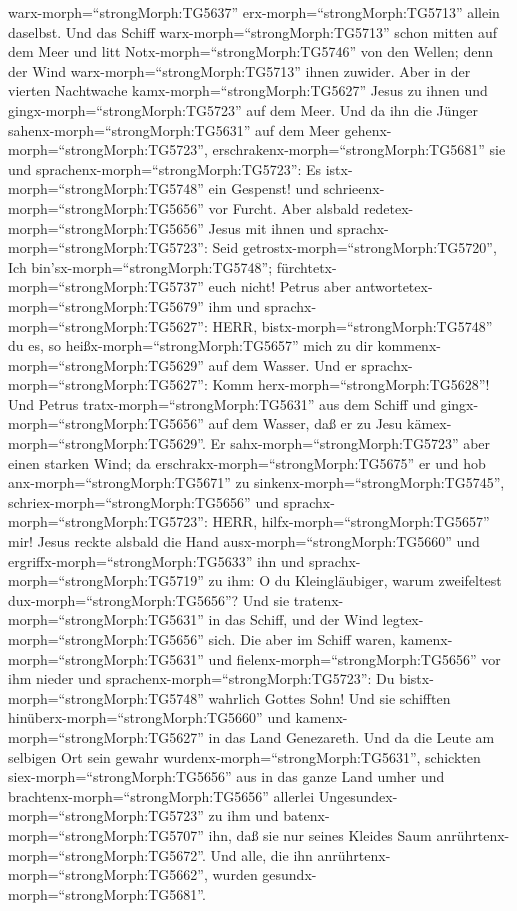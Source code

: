 warx-morph=``strongMorph:TG5637'' erx-morph=``strongMorph:TG5713''
allein daselbst.  Und das Schiff
warx-morph=``strongMorph:TG5713'' schon mitten auf dem Meer und litt
Notx-morph=``strongMorph:TG5746'' von den Wellen; denn der Wind
warx-morph=``strongMorph:TG5713'' ihnen zuwider.  Aber in
der vierten Nachtwache kamx-morph=``strongMorph:TG5627'' Jesus zu ihnen
und gingx-morph=``strongMorph:TG5723'' auf dem Meer.  Und
da ihn die Jünger sahenx-morph=``strongMorph:TG5631'' auf dem Meer
gehenx-morph=``strongMorph:TG5723'',
erschrakenx-morph=``strongMorph:TG5681'' sie und
sprachenx-morph=``strongMorph:TG5723'': Es
istx-morph=``strongMorph:TG5748'' ein Gespenst! und
schrieenx-morph=``strongMorph:TG5656'' vor Furcht.  Aber
alsbald redetex-morph=``strongMorph:TG5656'' Jesus mit ihnen und
sprachx-morph=``strongMorph:TG5723'': Seid
getrostx-morph=``strongMorph:TG5720'', Ich
bin'sx-morph=``strongMorph:TG5748'';
fürchtetx-morph=``strongMorph:TG5737'' euch nicht!  Petrus
aber antwortetex-morph=``strongMorph:TG5679'' ihm und
sprachx-morph=``strongMorph:TG5627'': HERR,
bistx-morph=``strongMorph:TG5748'' du es, so
heißx-morph=``strongMorph:TG5657'' mich zu dir
kommenx-morph=``strongMorph:TG5629'' auf dem Wasser.  Und
er sprachx-morph=``strongMorph:TG5627'': Komm
herx-morph=``strongMorph:TG5628''! Und Petrus
tratx-morph=``strongMorph:TG5631'' aus dem Schiff und
gingx-morph=``strongMorph:TG5656'' auf dem Wasser, daß er zu Jesu
kämex-morph=``strongMorph:TG5629''.  Er
sahx-morph=``strongMorph:TG5723'' aber einen starken Wind; da
erschrakx-morph=``strongMorph:TG5675'' er und hob
anx-morph=``strongMorph:TG5671'' zu
sinkenx-morph=``strongMorph:TG5745'',
schriex-morph=``strongMorph:TG5656'' und
sprachx-morph=``strongMorph:TG5723'': HERR,
hilfx-morph=``strongMorph:TG5657'' mir!  Jesus reckte
alsbald die Hand ausx-morph=``strongMorph:TG5660'' und
ergriffx-morph=``strongMorph:TG5633'' ihn und
sprachx-morph=``strongMorph:TG5719'' zu ihm: O du Kleingläubiger, warum
zweifeltest dux-morph=``strongMorph:TG5656''?  Und sie
tratenx-morph=``strongMorph:TG5631'' in das Schiff, und der Wind
legtex-morph=``strongMorph:TG5656'' sich.  Die aber im
Schiff waren, kamenx-morph=``strongMorph:TG5631'' und
fielenx-morph=``strongMorph:TG5656'' vor ihm nieder und
sprachenx-morph=``strongMorph:TG5723'': Du
bistx-morph=``strongMorph:TG5748'' wahrlich Gottes Sohn! 
Und sie schifften hinüberx-morph=``strongMorph:TG5660'' und
kamenx-morph=``strongMorph:TG5627'' in das Land Genezareth.
 Und da die Leute am selbigen Ort sein gewahr
wurdenx-morph=``strongMorph:TG5631'', schickten
siex-morph=``strongMorph:TG5656'' aus in das ganze Land umher und
brachtenx-morph=``strongMorph:TG5656'' allerlei
Ungesundex-morph=``strongMorph:TG5723'' zu ihm  und
batenx-morph=``strongMorph:TG5707'' ihn, daß sie nur seines Kleides Saum
anrührtenx-morph=``strongMorph:TG5672''. Und alle, die ihn
anrührtenx-morph=``strongMorph:TG5662'', wurden
gesundx-morph=``strongMorph:TG5681''.

